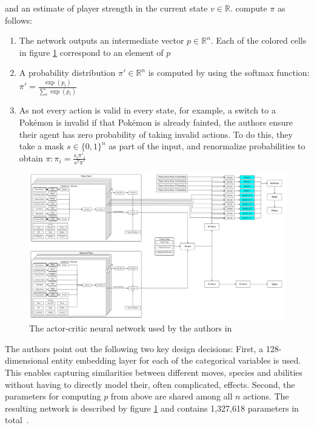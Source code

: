 and an estimate of player strength in the current state $v \in \mathbb{R}$. \cite{Huang_Lee_2019} compute
$\pi$ as follows:
\begin{enumerate}
    \item The network outputs an intermediate vector $p \in \mathbb{R}^n$. Each of the colored cells in
    figure \ref{fig:lee-network} correspond to an element of $p$
    \item A probability distribution $\pi' \in \mathbb{R}^n$ is computed by using the
    softmax function: \\ $\pi' = \frac{\exp(p_i)}{\sum_i \exp(p_i)}$
    \item As not every action is valid in every state, for example, a switch to a Pokémon is invalid
    if that Pokémon is already fainted, the authors ensure their agent has zero probability of taking
    invalid actions. To do this, they take a mask $s \in \{0, 1\}^n$ as part of the input, and 
    renormalize probabilities to obtain $\pi: \pi_i = \frac{s_i \pi'_i}{s^T \pi'}$
\end{enumerate}
\begin{figure}
	\centering
	\includegraphics[width=1\textwidth]{images/RL-Network-Structure.png}
	\caption{The actor-critic neural network used by the authors in~\autocite{Huang_Lee_2019}}
	\label{fig:lee-network}
\end{figure}
The authors point out the following two key design decisions: First, a 128-dimensional entity embedding layer
for each of the categorical variables is used. This enables capturing similarities between different moves,
species and abilities without having to directly model their, often complicated, effects. Second, the
parameters for computing $p$ from above are shared among all $n$ actions. The resulting network is described
by figure \ref{fig:lee-network} and contains 1,327,618 parameters in total~\autocite{Huang_Lee_2019}.

